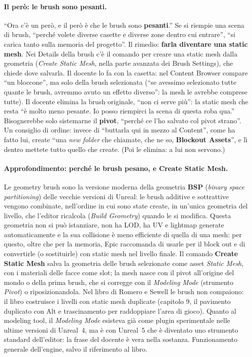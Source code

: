 \paragraph{Il però: le brush sono pesanti.} ``Ora c'è un però, e il però è che le brush
sono \textbf{pesanti}.'' Se si riempie una scena di brush, ``perché volete diverse casette e
diverse zone dentro cui entrare'', ``si carica tanto sulla memoria del progetto''. Il
rimedio: \textbf{farla diventare una static mesh}. Nei Details della brush c'è il comando
per creare una static mesh dalla geometria (\emph{Create Static Mesh}, nella parte avanzata
dei Brush Settings), che chiede dove salvarla. Il docente lo fa con la casetta: nel
Content Browser compare ``un bloccone'', ma solo della brush selezionata (``se avessimo
selezionato tutte quante le brush, avremmo avuto un effetto diverso'': la mesh le avrebbe
comprese tutte). Il docente elimina la brush originale, ``non ci serve più'': la static mesh
che resta ``è molto meno pesante. Io posso riempirci la scena di questa roba qua.''
Bisognerebbe solo sistemarne il \textbf{pivot}, ``perché ce l'ho salvato col pivot
strano''. Un consiglio di ordine: invece di ``buttarla qui in mezzo al Content'', come ha
fatto lui, create ``una \emph{new folder} che chiamate, che ne so, \textbf{Blockout
Assets}'', e lì dentro mettete tutto quello che create. (Poi le elimina: a lui non servono.)

\paragraph{Approfondimento: perché le brush pesano, e Create Static Mesh.} Le geometry
brush sono la versione moderna della geometria \textbf{BSP} (\emph{binary space
partitioning}) delle vecchie versioni di Unreal: le brush additive e sottrattive vengono
combinate, nell'ordine in cui sono state create, in un'unica geometria del livello, che
l'editor ricalcola (\emph{Build Geometry}) quando le si modifica. Questa geometria non si
può istanziare, non ha LOD, ha UV e lightmap generate automaticamente e la sua collisione
è meno efficiente di quella di una mesh: per questo, oltre che per la memoria, Epic
raccomanda di usarle per il block out e di convertirle (o sostituirle) con static mesh
nel livello finale. Il comando \textbf{Create Static Mesh} salva la geometria delle brush
selezionate come asset \emph{Static Mesh}, con i materiali delle facce come slot; la
mesh nasce con il pivot all'origine del mondo o della prima brush, che si corregge con il
\emph{Modeling Mode} (strumento \emph{Pivot}) o riposizionandola. Nel libro di Romero e
Sewell le brush non compaiono: il libro costruisce i livelli con static mesh duplicate
(capitolo 9, il pavimento duplicato con Alt e trascinamento per raddoppiare l'area di
gioco). Quanto al modeling tool, il \emph{Modeling Mode} esisteva già come plugin
sperimentale nelle ultime versioni di Unreal~4, ma è con Unreal~5 che è diventato uno
strumento standard dell'editor: la frase del docente è vera nella sostanza. Funzionamento
generale dell'engine, salvo il riferimento al libro.

